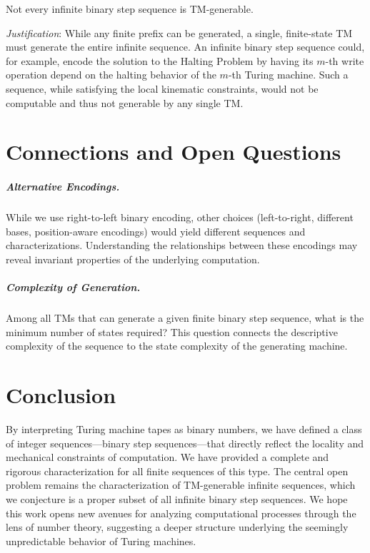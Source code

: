 \begin{conjecture}
Not every infinite binary step sequence is TM-generable.
\end{conjecture}

\emph{Justification}: While any finite prefix can be generated, a single, finite-state TM must generate the entire infinite sequence. An infinite binary step sequence could, for example, encode the solution to the Halting Problem by having its $m$-th write operation depend on the halting behavior of the $m$-th Turing machine. Such a sequence, while satisfying the local kinematic constraints, would not be computable and thus not generable by any single TM.

\chapter{Connections and Open Questions}

\paragraph{Alternative Encodings.} 
While we use right-to-left binary encoding, other choices (left-to-right, different bases, position-aware encodings) would yield different sequences and characterizations. Understanding the relationships between these encodings may reveal invariant properties of the underlying computation.

\paragraph{Complexity of Generation.} 
Among all TMs that can generate a given finite binary step sequence, what is the minimum number of states required? This question connects the descriptive complexity of the sequence to the state complexity of the generating machine.

\chapter{Conclusion}

By interpreting Turing machine tapes as binary numbers, we have defined a class of integer sequences---binary step sequences---that directly reflect the locality and mechanical constraints of computation. We have provided a complete and rigorous characterization for all finite sequences of this type. The central open problem remains the characterization of TM-generable infinite sequences, which we conjecture is a proper subset of all infinite binary step sequences. We hope this work opens new avenues for analyzing computational processes through the lens of number theory, suggesting a deeper structure underlying the seemingly unpredictable behavior of Turing machines.

